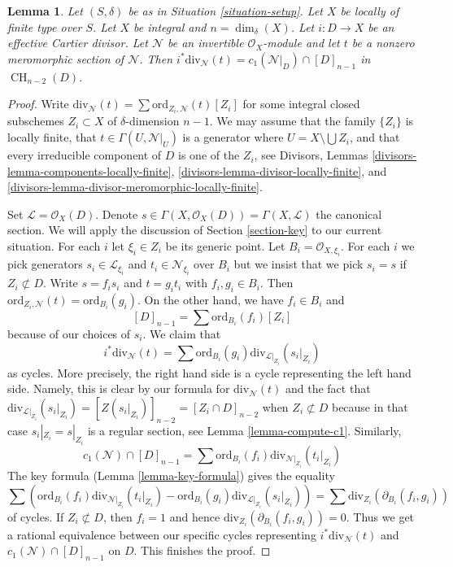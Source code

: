 \documentclass[10pt,a4paper]{amsart}
\theoremstyle{plain}
\newtheorem{lemma}[subsection]{Lemma}
\theoremstyle{definition}
\theoremstyle{remark}
\numberwithin{equation}{subsection}
\def\CH{\mathop{\mathrm{CH}}\nolimits}
\begin{document}
\begin{lemma}
\label{lemma-gysin-factors-general}
Let $(S, \delta)$ be as in Situation \ref{situation-setup}.
Let $X$ be locally of finite type over $S$.
Let $X$ be integral and $n = \dim_\delta(X)$.
Let $i : D \to X$ be an effective Cartier divisor.
Let $\mathcal{N}$ be an invertible $\mathcal{O}_X$-module
and let $t$ be a nonzero meromorphic section of $\mathcal{N}$.
Then $i^*\text{div}_\mathcal{N}(t) = c_1(\mathcal{N}|_D) \cap [D]_{n - 1}$
in $\CH_{n - 2}(D)$.
\end{lemma}

\begin{proof}
Write $\text{div}_\mathcal{N}(t) = \sum \text{ord}_{Z_i, \mathcal{N}}(t)[Z_i]$
for some integral closed subschemes $Z_i \subset X$ of $\delta$-dimension
$n - 1$. We may assume that the family $\{Z_i\}$ is locally
finite, that $t \in \Gamma(U, \mathcal{N}|_U)$ is a generator
where $U = X \setminus \bigcup Z_i$, and that every irreducible component
of $D$ is one of the $Z_i$, see
Divisors, Lemmas \ref{divisors-lemma-components-locally-finite},
\ref{divisors-lemma-divisor-locally-finite}, and
\ref{divisors-lemma-divisor-meromorphic-locally-finite}.

\medskip\noindent
Set $\mathcal{L} = \mathcal{O}_X(D)$. Denote
$s \in \Gamma(X, \mathcal{O}_X(D)) = \Gamma(X, \mathcal{L})$
the canonical section. We will apply the discussion of
Section \ref{section-key} to our current situation.
For each $i$ let $\xi_i \in Z_i$ be its generic point. Let
$B_i = \mathcal{O}_{X, \xi_i}$. For each $i$ we pick generators
$s_i \in \mathcal{L}_{\xi_i}$ and $t_i \in \mathcal{N}_{\xi_i}$
over $B_i$ but we insist that we pick $s_i = s$ if $Z_i \not \subset D$.
Write $s = f_i s_i$ and $t = g_i t_i$ with $f_i, g_i \in B_i$.
Then $\text{ord}_{Z_i, \mathcal{N}}(t) = \text{ord}_{B_i}(g_i)$.
On the other hand, we have $f_i \in B_i$ and
$$
[D]_{n - 1} = \sum \text{ord}_{B_i}(f_i)[Z_i]
$$
because of our choices of $s_i$. We claim that
$$
i^*\text{div}_\mathcal{N}(t) =
\sum \text{ord}_{B_i}(g_i) \text{div}_{\mathcal{L}|_{Z_i}}(s_i|_{Z_i})
$$
as cycles. More precisely, the right hand side is a cycle
representing the left hand side. Namely, this is clear by our
formula for $\text{div}_\mathcal{N}(t)$ and the fact that
$\text{div}_{\mathcal{L}|_{Z_i}}(s_i|_{Z_i}) = [Z(s_i|_{Z_i})]_{n - 2} =
[Z_i \cap D]_{n - 2}$ when $Z_i \not \subset D$ because in
that case $s_i|_{Z_i} = s|_{Z_i}$ is a regular section, see
Lemma \ref{lemma-compute-c1}. Similarly,
$$
c_1(\mathcal{N}) \cap [D]_{n - 1} =
\sum \text{ord}_{B_i}(f_i) \text{div}_{\mathcal{N}|_{Z_i}}(t_i|_{Z_i})
$$
The key formula (Lemma \ref{lemma-key-formula}) gives the equality
$$
\sum \left(
\text{ord}_{B_i}(f_i) \text{div}_{\mathcal{N}|_{Z_i}}(t_i|_{Z_i}) -
\text{ord}_{B_i}(g_i) \text{div}_{\mathcal{L}|_{Z_i}}(s_i|_{Z_i}) \right) =
\sum \text{div}_{Z_i}(\partial_{B_i}(f_i, g_i))
$$
of cycles. If $Z_i \not \subset D$, then $f_i = 1$ and hence
$\text{div}_{Z_i}(\partial_{B_i}(f_i, g_i)) = 0$. Thus we get a rational
equivalence between our specific cycles representing
$i^*\text{div}_\mathcal{N}(t)$ and $c_1(\mathcal{N}) \cap [D]_{n - 1}$
on $D$. This finishes the proof.
\end{proof}
\end{document}
